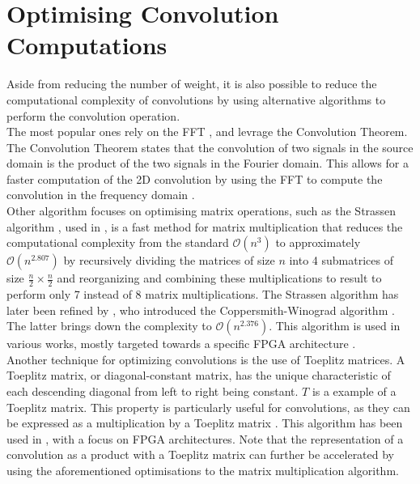 \section{Optimising Convolution Computations}
\label{sec:sota:fast_convolutions}

Aside from reducing the number of weight, it is also possible to reduce the
computational complexity of convolutions by using alternative algorithms to
perform the convolution operation.\\

The most popular ones rely on the \ac{FFT}
\cite{DBLP:conf/nips/ChiJM20,DBLP:journals/npl/LinY19,DBLP:conf/pkdd/PrattWCZ17},
and levrage the Convolution Theorem. The Convolution Theorem states that the
convolution of two signals in the source domain is the product of the two
signals in the Fourier domain. This allows for a faster computation of the 2D
convolution by using the \ac{FFT} to compute the convolution in the frequency
domain \cite{oppenheim1997signals}.\\


Other algorithm focuses on optimising matrix operations, such as the Strassen
algorithm \cite{strassen1969gaussian}, used in \cite{DBLP:conf/icann/CongX14},
is a fast method for matrix multiplication that reduces the computational
complexity from the standard $\mathcal{O}(n^{3})$ to approximately
$\mathcal{O}(n^{2.807})$ by recursively dividing the matrices of size $n$ into 4
submatrices of size $\frac{n}{2} \times \frac{n}{2}$ and reorganizing and
combining these multiplications to result to perform only 7 instead of 8 matrix
multiplications. The Strassen algorithm has later been refined by
\citeauthor{coppersmith1987matrix}, who introduced the Coppersmith-Winograd
algorithm \cite{coppersmith1987matrix}. The latter brings down the complexity to
$\mathcal{O}(n^{2.376})$. This algorithm is used in various works, mostly
targeted towards a specific \ac{FPGA} architecture
\cite{liu2018efficient,lu2018spwa,wang2020winonn}.\\


Another technique for optimizing convolutions is the use of Toeplitz matrices. A
Toeplitz matrix, or diagonal-constant matrix, has the unique characteristic of
each descending diagonal from left to right being constant. $T$ is a example of
a Toeplitz matrix. This property is particularly useful for convolutions, as
they can be expressed as a multiplication by a Toeplitz matrix
\cite{gray2006toeplitz}. This algorithm has been used in
\cite{liao2019compressing}, with a focus on \ac{FPGA} architectures. Note that
the representation of a convolution as a product with a Toeplitz matrix can
further be accelerated by using the aforementioned optimisations to the matrix
multiplication algorithm.\\


